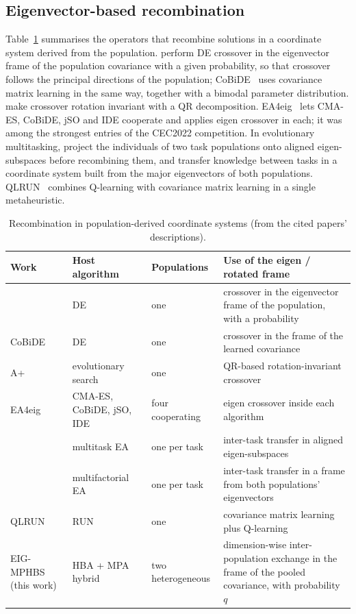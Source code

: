 \documentclass[preprint,12pt,authoryear]{elsarticle}
\theoremstyle{remark}
\begin{document}
\subsection{Eigenvector-based recombination}
Table~\ref{tab:related} summarises the operators that recombine solutions in a coordinate system derived from the
population. \citet{guo2015eigen} perform DE crossover in the eigenvector frame of the population covariance with a given
probability, so that crossover follows the principal directions of the population; CoBiDE~\citep{wang2014cobide} uses
covariance matrix learning in the same way, together with a bimodal parameter distribution. \citet{civicioglu2018aplus}
make crossover rotation invariant with a QR decomposition. EA4eig~\citep{bujok2022ea4eig} lets CMA-ES, CoBiDE, jSO and
IDE cooperate and applies eigen crossover in each; it was among the strongest entries of the CEC2022 competition. In
evolutionary multitasking, \citet{tang2021regularized} project the individuals of two task populations onto aligned
eigen-subspaces before recombining them, and \citet{tang2022adaptive} transfer knowledge between tasks in a coordinate
system built from the major eigenvectors of both populations. QLRUN~\citep{adam2027qlrun} combines Q-learning with
covariance matrix learning in a single metaheuristic.

\begin{table}[!htbp]
\centering
\caption{Recombination in population-derived coordinate systems (from the cited papers' descriptions).}
\label{tab:related}
\footnotesize
\begin{tabular}{p{3.3cm}p{3.0cm}p{3.6cm}p{5.1cm}}
\toprule
Work & Host algorithm & Populations & Use of the eigen / rotated frame \\
\midrule
\citet{guo2015eigen} & DE & one & crossover in the eigenvector frame of the population, with a probability \\
CoBiDE~\citep{wang2014cobide} & DE & one & crossover in the frame of the learned covariance \\
A+~\citep{civicioglu2018aplus} & evolutionary search & one & QR-based rotation-invariant crossover \\
EA4eig~\citep{bujok2022ea4eig} & CMA-ES, CoBiDE, jSO, IDE & four cooperating & eigen crossover inside each algorithm \\
\citet{tang2021regularized} & multitask EA & one per task & inter-task transfer in aligned eigen-subspaces \\
\citet{tang2022adaptive} & multifactorial EA & one per task & inter-task transfer in a frame from both populations' eigenvectors \\
QLRUN~\citep{adam2027qlrun} & RUN & one & covariance matrix learning plus Q-learning \\
\midrule
EIG-MPHBS (this work) & HBA + MPA hybrid & two heterogeneous & dimension-wise inter-population exchange in the frame of
the pooled covariance, with probability $q$ \\
\bottomrule
\end{tabular}
\end{table}
\end{document}

